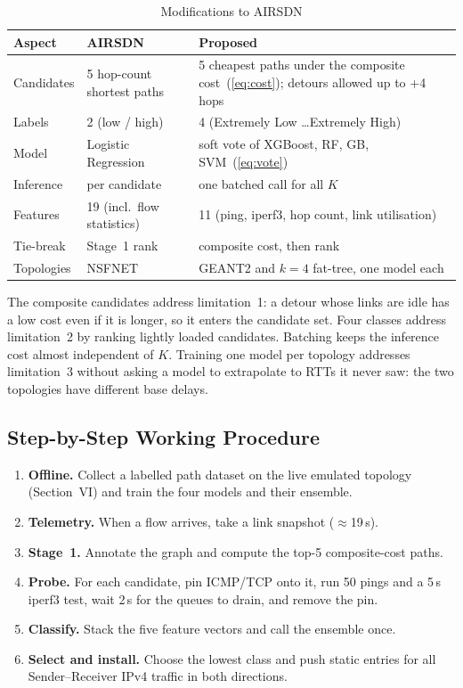 \documentclass[conference,a4paper]{IEEEtran}
\begin{document}
\begin{table}[t]
\centering
\caption{Modifications to AIRSDN}
\label{tab:mods}
\footnotesize
\begin{tabularx}{\columnwidth}{@{}>{\raggedright\arraybackslash}p{1.45cm}LL@{}}
\toprule
Aspect & AIRSDN~\cite{ipek2025airsdn} & Proposed \\
\midrule
Candidates & 5 hop-count shortest paths & 5 cheapest paths under the composite cost~(\ref{eq:cost}); detours allowed up to +4 hops \\
Labels & 2 (low / high) & 4 (Extremely Low \ldots Extremely High) \\
Model & Logistic Regression & soft vote of XGBoost, RF, GB, SVM~(\ref{eq:vote}) \\
Inference & per candidate & one batched call for all $K$ \\
Features & 19 (incl.\ flow statistics) & 11 (ping, iperf3, hop count, link utilisation) \\
Tie-break & Stage~1 rank & composite cost, then rank \\
Topologies & NSFNET & GEANT2 and $k=4$ fat-tree, one model each \\
\bottomrule
\end{tabularx}
\end{table}

The composite candidates address limitation~1: a detour whose links are idle has a low cost even if it is longer,
so it enters the candidate set. Four classes address limitation~2 by ranking lightly loaded candidates. Batching
keeps the inference cost almost independent of $K$. Training one model per topology addresses limitation~3 without
asking a model to extrapolate to RTTs it never saw: the two topologies have different base delays.

\subsection{Step-by-Step Working Procedure}
\begin{enumerate}
\item \textbf{Offline.} Collect a labelled path dataset on the live emulated topology (Section~VI) and train the
four models and their ensemble.
\item \textbf{Telemetry.} When a flow arrives, take a link snapshot ($\approx$19\,s).
\item \textbf{Stage~1.} Annotate the graph and compute the top-5 composite-cost paths.
\item \textbf{Probe.} For each candidate, pin ICMP/TCP onto it, run 50 pings and a 5\,s iperf3 test, wait 2\,s
for the queues to drain, and remove the pin.
\item \textbf{Classify.} Stack the five feature vectors and call the ensemble once.
\item \textbf{Select and install.} Choose the lowest class and push static entries for all Sender--Receiver IPv4
traffic in both directions.
\end{enumerate}
\end{document}
